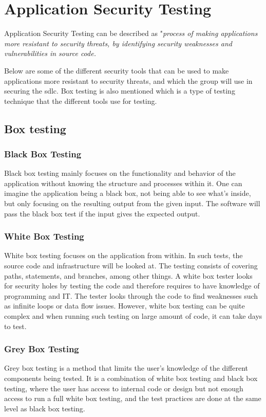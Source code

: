 \section{Application Security Testing}
Application Security Testing can be described as "\textit{process of making applications more resistant to security threats, by identifying security weaknesses and vulnerabilities in source code.}\cite{AST}

Below are some of the different security tools that can be used to make applications more resistant to security threats, and which the group will use in securing the \acrshort{sdlc}. Box testing is also mentioned which is a type of testing technique that the different tools use for testing.  

\subsection{Box testing}
\label{boxtesting}

\subsubsection{Black Box Testing}
Black box testing mainly focuses on the functionality and behavior of the application without knowing the structure and processes within it. One can imagine the application being a black box, not being able to see what's inside, but only focusing on the resulting output from the given input. The software will pass the black box test if the input gives the expected output. \cite{blackbox}

\subsubsection{White Box Testing}
White box testing focuses on the application from within. In such tests, the source code and infrastructure will be looked at. The testing consists of covering paths, statements, and branches, among other things. A white box tester looks for security holes by testing the code and therefore requires to have knowledge of programming and IT. The tester looks through the code to find weaknesses such as infinite loops or data flow issues. However, white box testing can be quite complex and when running such testing on large amount of code, it can take days to test.   \cite{whitebox}

\subsubsection{Grey Box Testing}
Grey box testing is a method that limits the user's knowledge of the different components being tested. It is a combination of white box testing and black box testing, where the user has access to internal code or design but not enough access to run a full white box testing, and the test practices are done at the same level as black box testing. \cite{GreyBox}


